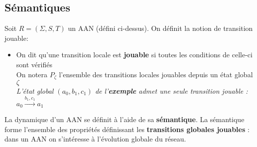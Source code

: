 \documentclass[12pt,a4paper]{article}
\begin{document}
\subsection{Sémantiques}
Soit $R = (\Sigma,S,T)$ un AAN (défini ci-dessus). On définit la notion de transition jouable:
\begin{itemize}
	\item On dit qu'une transition locale est \textbf{jouable} si toutes les conditions de celle-ci sont vérifiés\\
	On notera $P_{\zeta}$ l'ensemble des transitions locales jouables depuis un état global $\zeta$\\
	\emph{L'état global $(a_0,b_1,c_1)$ de l'\textbf{exemple} admet une seule transition jouable : $a_0\xrightarrow{b_1,c_1} a_1$}
\end{itemize}
La dynamique d'un AAN se définit à l'aide de sa \textbf{sémantique}. La sémantique forme l'ensemble des propriétés définissant les \textbf{transitions globales jouables} : dans un AAN on s'intéresse à l'évolution globale du réseau.
\end{document}

